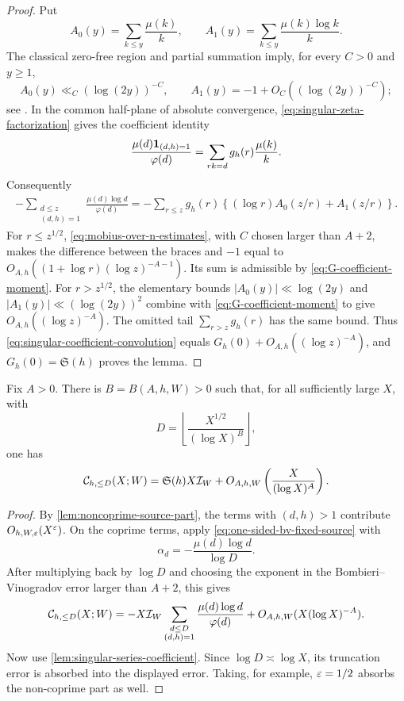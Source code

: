 \begin{proof}
Put
\[
 A_0(y)=\sum_{k\leq y}\frac{\mu(k)}k,
 \qquad
 A_1(y)=\sum_{k\leq y}\frac{\mu(k)\log k}{k}.
\]
The classical zero-free region and partial summation imply, for every
$C>0$ and $y\geq1$,
\begin{equation}\label{eq:mobius-over-n-estimates}
 A_0(y)\ll_C(\log(2y))^{-C},
 \qquad
 A_1(y)=-1+O_C((\log(2y))^{-C});
\end{equation}
see \citet{IwaniecKowalski2004,MontgomeryVaughan2007}.
In the common half-plane of absolute convergence,
\eqref{eq:singular-zeta-factorization} gives the coefficient identity
\[
 \frac{\mu(d)\mathbf 1_{(d,h)=1}}{\varphi(d)}
 =\sum_{rk=d}g_h(r)\frac{\mu(k)}k.
\]
Consequently
\begin{align}
 -\sum_{\substack{d\leq z\\(d,h)=1}}
   \frac{\mu(d)\log d}{\varphi(d)}
 =-\sum_{r\leq z}g_h(r)
 \left\{(\log r)A_0(z/r)+A_1(z/r)\right\}.
 \label{eq:singular-coefficient-convolution}
\end{align}
For $r\leq z^{1/2}$, \eqref{eq:mobius-over-n-estimates}, with $C$
chosen larger than $A+2$, makes the difference between the braces and $-1$
equal to $O_{A,h}((1+\log r)(\log z)^{-A-1})$.  Its sum is admissible by
\eqref{eq:G-coefficient-moment}.  For $r>z^{1/2}$, the elementary bounds
$|A_0(y)|\ll\log(2y)$ and $|A_1(y)|\ll(\log(2y))^2$ combine with
\eqref{eq:G-coefficient-moment} to give
$O_{A,h}((\log z)^{-A})$.  The omitted tail
$\sum_{r>z}g_h(r)$ has the same bound.  Thus
\eqref{eq:singular-coefficient-convolution} equals
$G_h(0)+O_{A,h}((\log z)^{-A})$, and
$G_h(0)=\mathfrak S(h)$ proves the lemma.
\end{proof}

\begin{corollary}
\label{cor:source-small-divisors}
Fix $A>0$.  There is $B=B(A,h,W)>0$ such that, for all sufficiently
large $X$, with
\begin{equation}\label{eq:small-divisor-cutoff}
 D=\left\lfloor\frac{X^{1/2}}{(\log X)^B}\right\rfloor,
\end{equation}
one has
\begin{equation}\label{eq:short-source-main-term}
 \mathcal C_{h,\leq D}(X;W)
 =\mathfrak S(h)X\mathcal I_W
  +O_{A,h,W}\left(\frac{X}{(\log X)^A}\right).
\end{equation}
\end{corollary}

\begin{proof}
By \cref{lem:noncoprime-source-part}, the terms with $(d,h)>1$ contribute
$O_{h,W,\varepsilon}(X^\varepsilon)$.  On the coprime terms, apply
\eqref{eq:one-sided-bv-fixed-source} with
\[
 \alpha_d=-\frac{\mu(d)\log d}{\log D}.
\]
After multiplying back by $\log D$ and choosing the exponent in the
Bombieri--Vinogradov error larger than $A+2$, this gives
\[
 \mathcal C_{h,\leq D}(X;W)
 =-X\mathcal I_W
  \sum_{\substack{d\leq D\\(d,h)=1}}
  \frac{\mu(d)\log d}{\varphi(d)}
 +O_{A,h,W}(X(\log X)^{-A}).
\]
Now use \cref{lem:singular-series-coefficient}.  Since
$\log D\asymp\log X$, its truncation error is absorbed into the displayed
error.  Taking, for example, $\varepsilon=1/2$ absorbs the non-coprime part as
well.
\end{proof}

